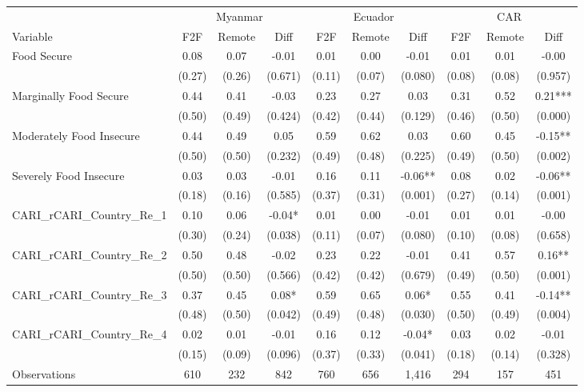 \begin{tabular}{l*{9}c}
\hline\hline
 & \multicolumn{3}{c}{Myanmar} & \multicolumn{3}{c}{Ecuador} & \multicolumn{3}{c}{CAR}\\ 
Variable & F2F & Remote & Diff & F2F & Remote & Diff & F2F & Remote & Diff \\
\hline
Food Secure&0.08&0.07&-0.01&0.01&0.00&-0.01&0.01&0.01&-0.00\\
&(0.27)&(0.26)&(0.671)&(0.11)&(0.07)&(0.080)&(0.08)&(0.08)&(0.957)\\
Marginally Food Secure&0.44&0.41&-0.03&0.23&0.27&0.03&0.31&0.52&0.21***\\
&(0.50)&(0.49)&(0.424)&(0.42)&(0.44)&(0.129)&(0.46)&(0.50)&(0.000)\\
Moderately Food Insecure&0.44&0.49&0.05&0.59&0.62&0.03&0.60&0.45&-0.15**\\
&(0.50)&(0.50)&(0.232)&(0.49)&(0.48)&(0.225)&(0.49)&(0.50)&(0.002)\\
Severely Food Insecure&0.03&0.03&-0.01&0.16&0.11&-0.06**&0.08&0.02&-0.06**\\
&(0.18)&(0.16)&(0.585)&(0.37)&(0.31)&(0.001)&(0.27)&(0.14)&(0.001)\\
CARI\_rCARI\_Country\_Re\_1&0.10&0.06&-0.04*&0.01&0.00&-0.01&0.01&0.01&-0.00\\
&(0.30)&(0.24)&(0.038)&(0.11)&(0.07)&(0.080)&(0.10)&(0.08)&(0.658)\\
CARI\_rCARI\_Country\_Re\_2&0.50&0.48&-0.02&0.23&0.22&-0.01&0.41&0.57&0.16**\\
&(0.50)&(0.50)&(0.566)&(0.42)&(0.42)&(0.679)&(0.49)&(0.50)&(0.001)\\
CARI\_rCARI\_Country\_Re\_3&0.37&0.45&0.08*&0.59&0.65&0.06*&0.55&0.41&-0.14**\\
&(0.48)&(0.50)&(0.042)&(0.49)&(0.48)&(0.030)&(0.50)&(0.49)&(0.004)\\
CARI\_rCARI\_Country\_Re\_4&0.02&0.01&-0.01&0.16&0.12&-0.04*&0.03&0.02&-0.01\\
&(0.15)&(0.09)&(0.096)&(0.37)&(0.33)&(0.041)&(0.18)&(0.14)&(0.328)\\
\hline
Observations & 610 & 232 & 842 & 760 & 656 & 1,416 & 294 & 157 & 451 \\
\hline\hline
\end{tabular}

